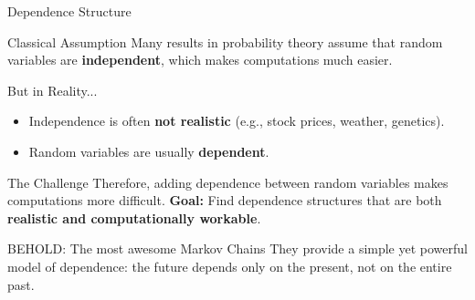 \documentclass[8pt]{beamer}
\begin{document}
\begin{frame}{Dependence Structure}
\begin{block}{Classical Assumption}
Many results in probability theory assume that random variables are 
\textbf{independent}, which makes computations much easier.
\end{block}

\begin{exampleblock}{But in Reality...}
\begin{itemize}
  \item Independence is often \textbf{not realistic} 
        (e.g., stock prices, weather, genetics).  
  \item Random variables are usually \textbf{dependent}.
\end{itemize}
\end{exampleblock}

\begin{alertblock}{The Challenge}
\vspace{1mm}
Therefore, adding dependence between random variables makes computations more difficult.  
\newline
\newline
\textbf{Goal:} Find dependence structures that are both \textbf{realistic and computationally workable}.
\end{alertblock}

\vspace{2mm}

\begin{block}{BEHOLD: The most awesome Markov Chains}
\vspace{1mm}
They provide a \alert{simple yet powerful model of dependence}: the future depends only on the present, not on the entire past.
\end{block}
\end{frame}
\end{document}
